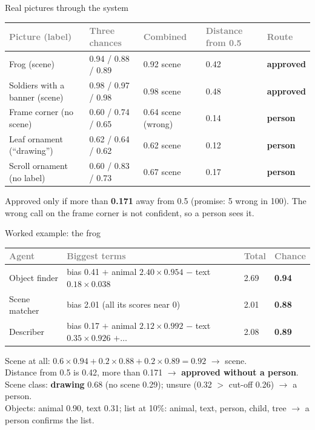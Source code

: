 \documentclass[aspectratio=169,11pt]{beamer}
\renewcommand{\arraystretch}{1.3}
\newcommand{\yes}[1]{\textcolor{accent}{\textbf{#1}}}
\newcommand{\no}[1]{\textcolor{warn}{\textbf{#1}}}
\newcommand{\h}[1]{\textcolor{grey}{#1}}
\newcommand{\remark}[1]{\par\vspace{0.35cm}{\small\textcolor{grey}{#1}}}
\begin{document}
\begin{frame}{Real pictures through the system}
\footnotesize
\renewcommand{\arraystretch}{0.95}\begin{tabular}{@{}L{3.3cm} L{2.6cm} L{2.2cm} L{1.7cm} L{1.8cm}@{}}
\toprule
\h{Picture (label)} & \h{Three chances} & \h{Combined} & \h{Distance from 0.5} & \h{Route}\\
\midrule
Frog (scene) & 0.94 / 0.88 / 0.89 & 0.92 scene & 0.42 & \yes{approved}\\
Soldiers with a banner (scene) & 0.98 / 0.97 / 0.98 & 0.98 scene & 0.48 & \yes{approved}\\
Frame corner (no scene) & 0.60 / 0.74 / 0.65 & 0.64 scene (wrong) & 0.14 & \no{person}\\
Leaf ornament (``drawing'') & 0.62 / 0.64 / 0.62 & 0.62 scene & 0.12 & \no{person}\\
Scroll ornament (no label) & 0.60 / 0.83 / 0.73 & 0.67 scene & 0.17 & \no{person}\\
\bottomrule
\end{tabular}

\vspace{0.2cm}
Approved only if more than \textbf{0.171} away from 0.5 (promise: 5 wrong in 100). The wrong call on the frame corner is not confident, so a person sees it.
\remark{Chances: object finder / scene matcher / describer (scene at all). Appendix A adds the scene class and object list.}
\end{frame}

\begin{frame}{Worked example: the frog}
\small
\begin{tabular}{@{}L{2.8cm} L{6.6cm} C{1.4cm} C{1.4cm}@{}}
\toprule
\h{Agent} & \h{Biggest terms} & \h{Total} & \h{Chance}\\
\midrule
Object finder & bias 0.41 $+$ animal $2.40 \times 0.954$ $-$ text $0.18 \times 0.038$ & 2.69 & \textbf{0.94}\\
Scene matcher & bias 2.01 (all its scores near 0) & 2.01 & \textbf{0.88}\\
Describer & bias 0.17 $+$ animal $2.12 \times 0.992$ $-$ text $0.35 \times 0.926$ $+ \dots$ & 2.08 & \textbf{0.89}\\
\bottomrule
\end{tabular}
\vspace{0.4cm}
\normalsize

Scene at all: $0.6 \times 0.94 + 0.2 \times 0.88 + 0.2 \times 0.89 = \mathbf{0.92}$ $\to$ scene.\\
Distance from 0.5 is 0.42, more than 0.171 $\to$ \yes{approved without a person}.\\[0.2cm]
Scene class: \textbf{drawing} 0.68 (no scene 0.29); unsure (0.32 $>$ cut-off 0.26) $\to$ a person.\\
Objects: animal 0.90, text 0.31; list at 10\%: animal, text, person, child, tree $\to$ a person confirms the list.
\end{frame}
\end{document}
